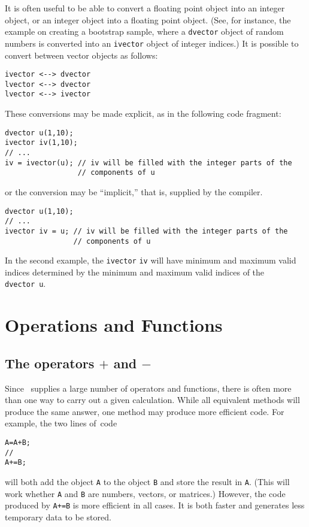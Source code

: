 \documentclass{admbmanual}
\begin{document}
It is often useful to be able to convert a floating point object into an integer
object, or an integer object into a floating point object. (See, for instance,
the example on creating a bootstrap sample, where a \texttt{dvector} object of
random numbers is converted into an \texttt{ivector} object of integer indices.)
It is possible to convert between vector objects as follows:
\begin{lstlisting}
ivector <--> dvector
lvector <--> dvector
lvector <--> ivector
\end{lstlisting}

These conversions may be made explicit, as in the following code fragment:
\begin{lstlisting}
dvector u(1,10);
ivector iv(1,10);
// ...
iv = ivector(u); // iv will be filled with the integer parts of the
                 // components of u
\end{lstlisting}
or the conversion may be ``implicit,'' that is, supplied by the compiler.
\begin{lstlisting}
dvector u(1,10);
// ...
ivector iv = u; // iv will be filled with the integer parts of the
                // components of u
\end{lstlisting}

In the second example, the \texttt{ivector} \texttt{iv} will have minimum and
maximum valid indices determined by the minimum and maximum valid indices of the
\texttt{dvector}~\texttt{u}.


\chapter{Operations and Functions}

\section{The operators  $+$ and  $-$}

Since \scAD\ supplies a large number of operators and functions, there is often
more than one way to carry out a given calculation. While all equivalent methods
will produce the same answer, one method may produce more efficient code. For
example, the two lines of~code
\begin{lstlisting}
A=A+B;
//
A+=B;
\end{lstlisting}
will both add the object \texttt{A} to the object \texttt{B} and store the
result in \texttt{A}. (This will work whether \texttt{A} and \texttt{B} are
numbers, vectors, or matrices.) However, the code produced by \texttt{A+=B} is
more efficient in all cases. It is both faster and generates less temporary data
to be stored.
\end{document}
